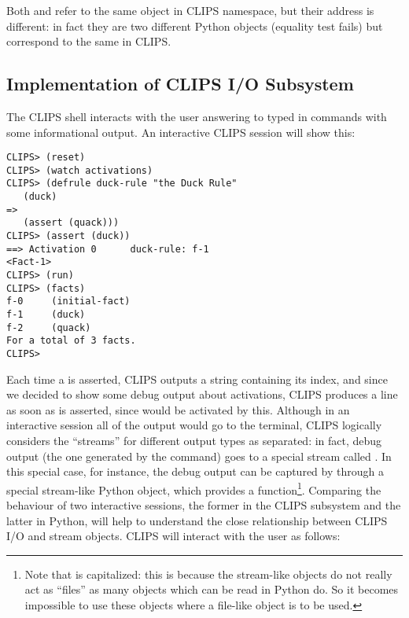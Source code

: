 Both  and  refer to the same object in CLIPS namespace,
but their address is different: in fact they are two different Python
objects (equality test fails) but correspond to the same  in
CLIPS.

\begin{seealso}
\sclipsbpg{}
\end{seealso}


\subsection{Implementation of CLIPS I/O Subsystem\label{pyclips-ov-io}}

The CLIPS shell interacts with the user answering to typed in commands
with some informational output. An interactive CLIPS session will show
this:

\begin{verbatim}
CLIPS> (reset)
CLIPS> (watch activations)
CLIPS> (defrule duck-rule "the Duck Rule"
   (duck)
=>
   (assert (quack)))
CLIPS> (assert (duck))
==> Activation 0      duck-rule: f-1
<Fact-1>
CLIPS> (run)
CLIPS> (facts)
f-0     (initial-fact)
f-1     (duck)
f-2     (quack)
For a total of 3 facts.
CLIPS>
\end{verbatim}

Each time a  is asserted, CLIPS outputs a string containing
its index, and since we decided to show some debug output about
activations, CLIPS produces a line as soon as  is asserted,
since  would be activated by this. Although in an
interactive session all of the output would go to the terminal, CLIPS
logically considers the ``streams'' for different output types as
separated: in fact, debug output (the one generated by the 
command) goes to a special stream called . In this special
case, for instance, the debug output can be captured by \pyclips{}
through a special stream-like Python object, which provides a
 function\footnote{Note that  is
capitalized: this is because the stream-like objects do not really act
as ``files'' as many objects which can be read in Python do. So it
becomes impossible to use these \pyclips{} objects where a file-like
object is to be used.}. Comparing the behaviour of two interactive
sessions, the former in the CLIPS subsystem and the latter in Python,
will help to understand the close relationship between CLIPS I/O and
\pyclips{} stream objects. CLIPS will interact with the user as
follows:

